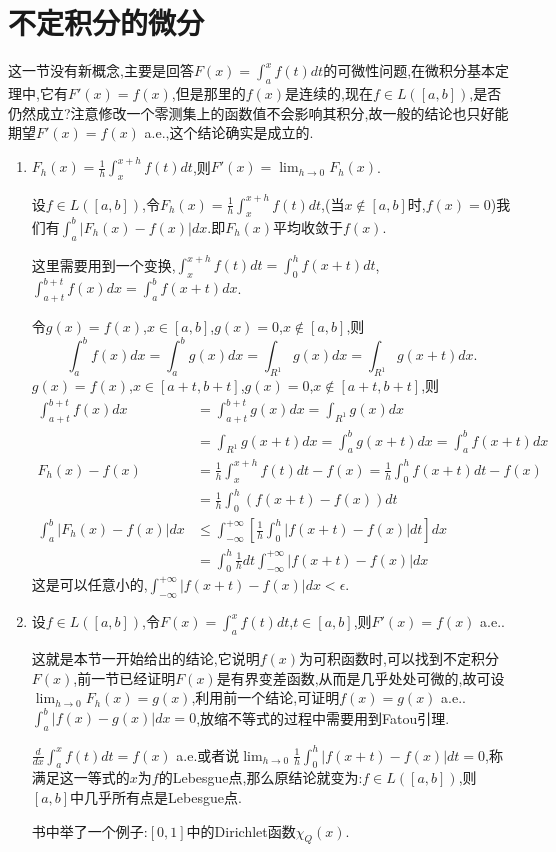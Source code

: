 \documentclass[12pt,a4paper,openany]{book}
\begin{document}
\section{不定积分的微分}
这一节没有新概念,主要是回答$F(x)=\int_{a}^{x}{f(t)dt}$的可微性问题,在微积分基本定理中,它有$F'(x)=f(x)$,但是那里的$f(x)$是连续的,现在$f \in L([a,b])$,是否仍然成立?注意修改一个零测集上的函数值不会影响其积分,故一般的结论也只好能期望$F'(x)=f(x)$ a.e.,这个结论确实是成立的.
\begin{enumerate}
\item $F_h(x) = \frac{1}{h}\int_{x}^{x+h}{f(t)dt}$,则$F'(x)=\lim_{h \rightarrow 0}{F_h(x)}$.

设$f \in L([a,b])$,令$F_h(x)=\frac{1}{h}\int_{x}^{x+h}{f(t)dt}$,(当$x \notin [a,b]$时,$f(x)=0$)我们有$\int_{a}^{b}{|F_h(x)-f(x)|dx}$.即$F_h(x)$平均收敛于$f(x)$.

这里需要用到一个变换,$\int_{x}^{x+h}{f(t)dt}=\int_{0}^{h}{f(x+t)dt}$,$\int_{a+t}^{b+t}{f(x)dx} = \int_{a}^{b}{f(x+t)dx}$.

令$g(x)=f(x)$,$x \in [a,b]$,$g(x)=0$,$x \notin [a,b]$,则
\[
\int_{a}^{b}{f(x)dx} = \int_{a}^{b}{g(x)dx} = \int_{R^1}{g(x)dx}=\int_{R^1}{g(x+t)dx}.
\]
$g(x)=f(x)$,$x \in [a+t,b+t]$,$g(x)=0$,$x \notin [a+t,b+t]$,则
\[
\begin{aligned}
\int_{a+t}^{b+t}{f(x)dx}&=\int_{a+t}^{b+t}{g(x)dx}=\int_{R^1}{g(x)dx}\\
&=\int_{R^1}{g(x+t)dx}=\int_{a}^{b}{g(x+t)dx}=\int_{a}^{b}{f(x+t)dx}\\
F_h(x)-f(x)&=\frac{1}{h}\int_{x}^{x+h}{f(t)dt}-f(x)=\frac{1}{h}\int_{0}^{h}{f(x+t)dt} - f(x)\\
&=\frac{1}{h}\int_{0}^{h}{(f(x+t)-f(x))dt} \\
\int_{a}^{b}{|F_h(x)-f(x)|dx} &\le \int_{-\infty}^{+\infty}{[\frac{1}{h}\int_{0}^{h}{|f(x+t)-f(x)|dt}]dx} \\
&=\int_{0}^{h}{\frac{1}{h}dt}\int_{-\infty}^{+\infty}{|f(x+t)-f(x)|dx}
\end{aligned}
\]
这是可以任意小的,$\int_{-\infty}^{+\infty}{|f(x+t)-f(x)|dx} < \epsilon$.

\item 设$f \in L([a,b])$,令$F(x)=\int_{a}^{x}{f(t)dt}$,$t \in [a,b]$,则$F'(x)=f(x)$ a.e..

这就是本节一开始给出的结论,它说明$f(x)$为可积函数时,可以找到不定积分$F(x)$,前一节已经证明$F(x)$是有界变差函数,从而是几乎处处可微的,故可设$\lim_{h \rightarrow 0}{F_h(x)}=g(x)$,利用前一个结论,可证明$f(x)=g(x)$ a.e..$\int_{a}^{b}{|f(x)-g(x)|dx}=0$,放缩不等式的过程中需要用到Fatou引理.

$\frac{d}{dx}\int_{a}^{x}{f(t)dt}=f(x)$ a.e.或者说$\lim_{h \rightarrow 0}{\frac{1}{h}\int_{0}^{h}{|f(x+t)-f(x)|dt}}=0$,称满足这一等式的$x$为$f$的Lebesgue点,那么原结论就变为:$f \in L([a,b])$,则$[a,b]$中几乎所有点是Lebesgue点.

书中举了一个例子:$[0,1]$中的Dirichlet函数$\chi_{Q}(x)$.
\end{enumerate}
\end{document}
